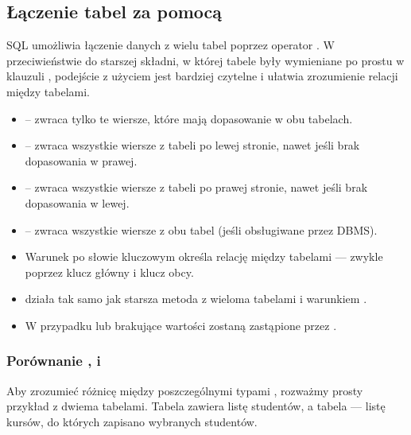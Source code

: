 \subsection{Łączenie tabel za pomocą }

SQL umożliwia łączenie danych z wielu tabel poprzez operator .  
W przeciwieństwie do starszej składni, w której tabele były wymieniane po prostu w klauzuli ,  
podejście z użyciem  jest bardziej czytelne i ułatwia zrozumienie relacji między tabelami.

\begin{itemize}
    \item {} – zwraca tylko te wiersze, które mają dopasowanie w obu tabelach.
    \item {} – zwraca wszystkie wiersze z tabeli po lewej stronie, nawet jeśli brak dopasowania w prawej.
    \item {} – zwraca wszystkie wiersze z tabeli po prawej stronie, nawet jeśli brak dopasowania w lewej.
    \item {} – zwraca wszystkie wiersze z obu tabel (jeśli obsługiwane przez DBMS).
\end{itemize}

\begin{tcolorbox}[blue={Wskazówka dotycząca JOIN}]
\begin{itemize}
    \item Warunek po słowie kluczowym  określa relację między tabelami — zwykle poprzez klucz główny i klucz obcy.
    \item {} działa tak samo jak starsza metoda z wieloma tabelami i warunkiem .
    \item W przypadku  lub  brakujące wartości zostaną zastąpione przez .
\end{itemize}
\end{tcolorbox}

\subsubsection{Porównanie ,  i }

Aby zrozumieć różnicę między poszczególnymi typami , rozważmy prosty przykład z dwiema tabelami.  
Tabela  zawiera listę studentów, a tabela  — listę kursów, do których zapisano wybranych studentów.

